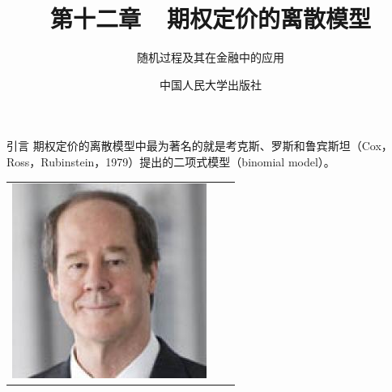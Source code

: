 \documentclass[t]{beamer}
\begin{document}
\fontsize{11}{18}\selectfont


\CTEXindent



  \title{第十二章~~期权定价的离散模型}
\author{随机过程及其在金融中的应用}
\date{中国人民大学出版社}
  \begin{frame}
    \maketitle
  \end{frame}

\begin{frame}{引言}
	期权定价的离散模型中最为著名的就是考克斯、罗斯和鲁宾斯坦（Cox，Ross，Rubinstein，1979）提出的二项式模型（binomial model）。
	\begin{center}
\begin{tabular}{ccc}
\includegraphics[height=0.4\textheight]{fig/Cox.jpeg}

\end{tabular}
\end{center}
\end{frame}
\end{document}
